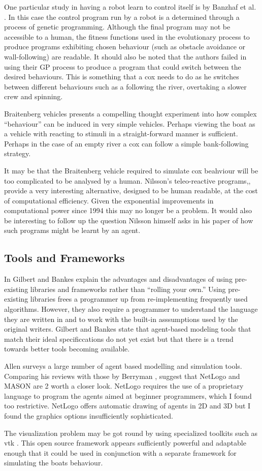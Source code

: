 One particular study in having a robot learn to control itself is by
Banzhaf et al. \cite{Banzhaf1997}. In this case the control program
run by a robot is a determined through a process of genetic
programming. Although the final program may not be accessible to a
human, the fitness functions used in
the evolutionary process to produce programs exhibiting chosen
behaviour (such as obstacle avoidance or wall-following) are
readable. It should also be noted that the authors failed in using
their GP process to produce a program that could switch between the
desired behaviours. This is something that a cox needs to do as he
switches between different behaviours such as a following the river, overtaking a
slower crew and spinning.

Braitenberg vehicles \cite{Braitenberg1986} presents a compelling
thought experiment into how complex ``behaviour'' can be induced in
very simple vehicles. Perhaps viewing the boat as a vehicle with
reacting to stimuli in a straight-forward manner is
sufficient. Perhaps in the case of an empty river a cox can follow a
simple bank-following strategy.

It may be that the Braitenberg vehicle required to simulate cox
beahviour will be too complicated to be analysed by a human. Nilsson's
teleo-reactive programs,\cite{Nilsson1994}, provide a very interesting
alternative, designed to be human readable, at the cost of
computational efficiency. Given the exponential improvements in
computational power since 1994 this may no longer be a problem. It
would also be interesting to follow up the question Nilsson himself
asks in his paper of how such programs might be learnt by an agent.

\subsection{Tools and Frameworks}
In \cite{Gilbert2002} Gilbert and Bankes explain the advantages and
disadvantages of using pre-existing libraries and frameworks rather
than ``rolling your own.'' Using pre-existing libraries frees a
programmer up from re-implementing frequently used
algorithms. However, they also require a programmer to understand the
language they are written in and to work with the built-in
asssumptions used by the original writers. Gilbert and Bankes state
that agent-based modeling tools that match their ideal specificcations
do not yet exist but that there is a trend towards better
tools becoming available.

Allen \cite{Allen2009} surveys a large number of agent based
modelling and simulation tools. Comparing his reviews with those by
Berryman \cite{Berryman2008}, suggest that NetLogo and MASON are 2
worth a closer look. NetLogo requires the use of a proprietary
language to program the agents aimed at beginner programmers, which I
found too restrictive. NetLogo offers automatic drawing of agents in
2D and 3D but I found the graphics options insufficiently
sophisticated.

The visualization problem may be got round by using specialized
toolkits such as vtk \cite{website:vtk}. This open source framework
appears sufficiently powerful and adaptable enough that it could be
used in conjunction with a separate framework for simulating the boats behaviour.

